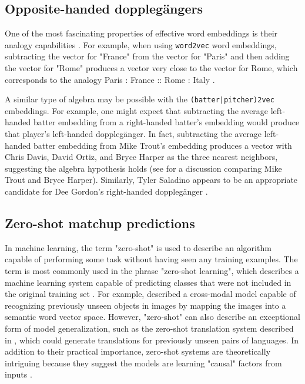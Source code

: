 \documentclass{article}
\begin{document}
\subsection{Opposite-handed dopplegängers}

One of the most fascinating properties of effective word embeddings is their analogy capabilities \parencite{Mikolov2013a}. For example, when using \texttt{word2vec} word embeddings, subtracting the vector for "France" from the vector for "Paris" and then adding the vector for "Rome" produces a vector very close to the vector for Rome, which corresponds to the analogy Paris : France :: Rome : Italy \parencite{Mikolov2013a}.

A similar type of algebra may be possible with the \texttt{(batter|pitcher)2vec} embeddings. For example, one might expect that subtracting the average left-handed batter embedding from a right-handed batter's embedding would produce that player's left-handed dopplegänger. In fact, subtracting the average left-handed batter embedding from Mike Trout's embedding produces a vector with Chris Davis, David Ortiz, and Bryce Harper as the three nearest neighbors, suggesting the algebra hypothesis holds (see \parencite{Spector2016} for a discussion comparing Mike Trout and Bryce Harper). Similarly, Tyler Saladino appears to be an appropriate candidate for Dee Gordon's right-handed dopplegänger \parencite{Chamberlain2017}.

\subsection{Zero-shot matchup predictions}

In machine learning, the term "zero-shot" is used to describe an algorithm capable of performing some task without having seen any training examples. The term is most commonly used in the phrase "zero-shot learning", which describes a machine learning system capable of predicting classes that were not included in the original training set \parencite{Palatucci2009}. For example, \parencite{Socher2013} described a cross-modal model capable of recognizing previously unseen objects in images by mapping the images into a semantic word vector space. However, "zero-shot" can also describe an exceptional form of model generalization, such as the zero-shot translation system described in \parencite{Johnson2016}, which could generate translations for previously unseen pairs of languages. In addition to their practical importance, zero-shot systems are theoretically intriguing because they suggest the models are learning "causal" factors from inputs \parencite{RepresentationLearning}.
\end{document}
